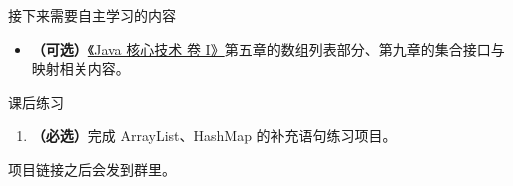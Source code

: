 \documentclass[aspectratio=169]{beamer}
\begin{document}
\begin{frame}{接下来需要自主学习的内容}
  \begin{itemize}
    \item \textbf{（可选）}\href{https://www.informit.com/store/core-java-volumei-fundamentals-9780135558607}{《Java 核心技术 卷 I》}第五章的数组列表部分、第九章的集合接口与映射相关内容。
  \end{itemize}
\end{frame}

\begin{frame}{课后练习}
  \begin{enumerate}
    \item \textbf{（必选）}完成 ArrayList、HashMap 的补充语句练习项目。
  \end{enumerate}
  \bigskip
  项目链接之后会发到群里。
\end{frame}
\end{document}
